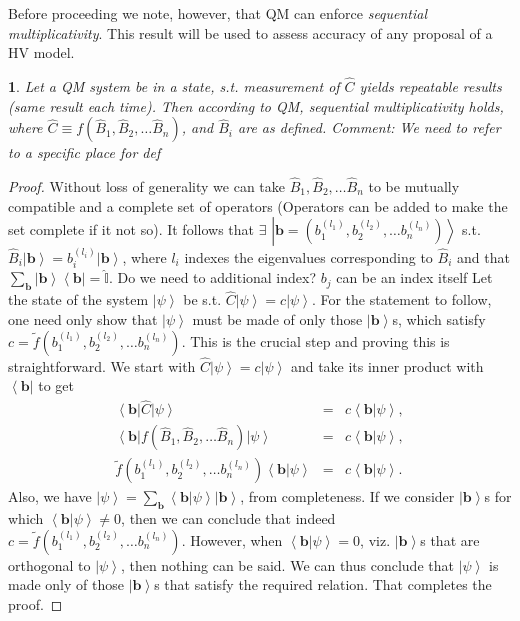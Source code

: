 \documentclass[british,aps,prl,superscriptaddress,nofootinbib,times,reprint]{revtex4-1}
\theoremstyle{plain}
\theoremstyle{definition}
\theoremstyle{remark}
\theoremstyle{plain}
\newtheorem*{prop*}{\protect\propositionname}
\theoremstyle{plain}
\theoremstyle{plain}
\theoremstyle{definition}
\theoremstyle{definition}
\providecommand{\propositionname}{Proposition}
\begin{document}
Before proceeding we note, however, that QM can
enforce \emph{sequential multiplicativity}. This
result will be used to assess accuracy of any
proposal of a HV
model.
\begin{prop*} 
Let a QM 
system be in a state, s.t. measurement of
$\hat{C}$ yields repeatable results (same result
each time). Then according to QM, \emph{sequential
multiplicativity} holds, where $\hat{C}\equiv
f(\hat{B}_{1},\hat{B}_{2},\dots\hat{B}_{n})$, and
$\hat{B}_{i}$ are as defined. 
{\color{red} Comment: We need to refer to a specific place
for def}
\end{prop*}
\begin{proof} 
Without loss of generality we can take
$\hat{B}_{1},\hat{B}_{2},\dots\hat{B}_{n}$ to be
mutually compatible and a complete set of
operators (Operators can be added to make the set
complete if it not so).
It follows
that $\exists$
$\left|\mathbf{b}=\left(b_{1}^{(l_{1})},b_{2}^{(l_{2})},\dots
b_{n}^{(l_{n})}\right)\right\rangle $ s.t.
$\hat{B}_{i}\left|\mathbf{b}\right\rangle
=b_{i}^{(l_{i})}\left|\mathbf{b}\right\rangle $,
where $l_{i}$ indexes the eigenvalues
corresponding to $\hat{B}_{i}$ and that
$\sum_{\mathbf{b}}\left|\mathbf{b}\right\rangle
\left\langle \mathbf{b}\right|=\hat{\mathbb{I}}$.
{\color{red} Do we need to additional index? $b_j$
can be an index itself}
Let the state of the system
$\left|\psi\right\rangle $ be s.t.
$\hat{C}\left|\psi\right\rangle
=c\left|\psi\right\rangle $. For
the statement to follow, one need only show that
$\left|\psi\right\rangle $ must be made of only
those $\left|\mathbf{b}\right\rangle $s, which
satisfy $c=\tilde
f(b_{1}^{(l_{1})},b_{2}^{(l_{2})},\dots
b_{n}^{(l_{n})})$.  This is the crucial step and
proving this is straightforward. We start with
$\hat{C}\left|\psi\right\rangle
=c\left|\psi\right\rangle $ and take its inner
product with $\left\langle \mathbf{b}\right|$ to
get \begin{eqnarray*} \left\langle
\mathbf{b}\right|\hat{C}\left|\psi\right\rangle  &
= & c\left\langle \mathbf{b}|\psi\right\rangle ,\\
\left\langle
\mathbf{b}\right|f(\hat{B}_{1},\hat{B}_{2},\dots\hat{B}_{n})
\left|\psi\right\rangle
& = & c\left\langle \mathbf{b}|\psi\right\rangle
,\\ \tilde f(b_{1}^{(l_{1})},b_{2}^{(l_{2})},\dots
b_{n}^{(l_{n})})\left\langle
\mathbf{b}|\psi\right\rangle  & = & c\left\langle
\mathbf{b}|\psi\right\rangle .  \end{eqnarray*}
Also, we have $\left|\psi\right\rangle
=\sum_{\mathbf{b}}\left\langle
\mathbf{b}|\psi\right\rangle
\left|\mathbf{b}\right\rangle $, from
completeness. If we consider
$\left|\mathbf{b}\right\rangle $s for which
$\left\langle \mathbf{b}|\psi\right\rangle \neq0$,
then we can conclude that indeed $c=\tilde
f(b_{1}^{(l_{1})},b_{2}^{(l_{2})},\dots
b_{n}^{(l_{n})})$. However, when $\left\langle
\mathbf{b}|\psi\right\rangle =0$, viz.
$\left|\mathbf{b}\right\rangle $s that are
orthogonal to $\left|\psi\right\rangle $, then
nothing can be said. We can thus conclude that
$\left|\psi\right\rangle $ is made only of those
$\left|\mathbf{b}\right\rangle $s that satisfy the
required relation. That completes the proof.
\end{proof} 
\end{document}

